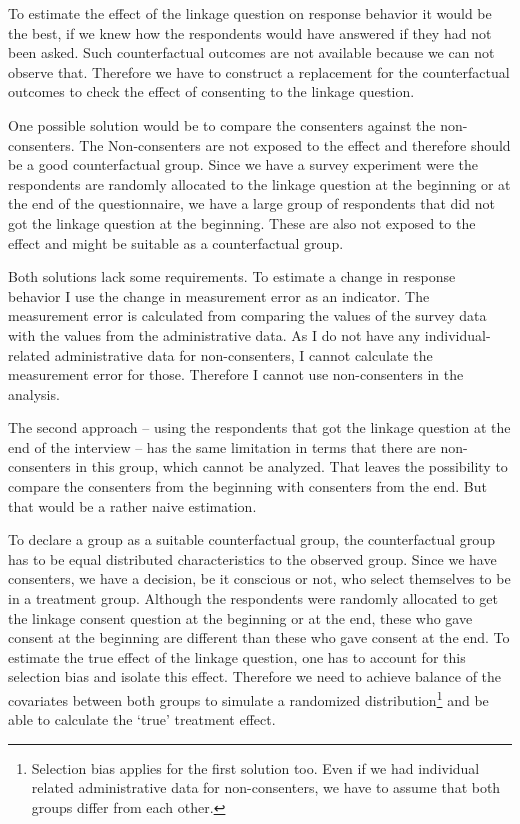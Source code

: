 To estimate the effect of the linkage question on response behavior it would be the best, if we knew how the respondents would have answered if they had not been asked. Such counterfactual outcomes are not available because we can not observe that. Therefore we have to construct a replacement for the counterfactual outcomes to check the effect of consenting to the linkage question. 

One possible solution would be to compare the consenters against the non-consenters. The Non-consenters are not exposed to the effect and therefore should be a good counterfactual group. Since we have a survey experiment were the respondents are randomly allocated to the linkage question at the beginning or at the end of the questionnaire, we have a large group of respondents that did not got the linkage question at the beginning. These are also not exposed to the effect and might be suitable as a counterfactual group. 

Both solutions lack some requirements. To estimate a change in response behavior I use the change in measurement error as an indicator. The measurement error is calculated from comparing the values of the survey data with the values from the administrative data. As I do not have any individual-related administrative data for non-consenters, I cannot calculate the measurement error for those. Therefore I cannot use non-consenters in the analysis. 

The second approach -- using the respondents that got the linkage question at the end of the interview -- has the same limitation in terms that there are non-consenters in this group, which cannot be analyzed. That leaves the possibility to compare the consenters from the beginning with consenters from the end. But that would be a rather naive estimation. 

To declare a group as a suitable counterfactual group, the counterfactual group has to be equal distributed characteristics to the observed group. Since we have consenters, we have a decision, be it conscious or not, who select themselves to be in a treatment group. Although the respondents were randomly allocated to get the linkage consent question at the beginning or at the end, these who gave consent at the beginning are different than these who gave consent at the end. To estimate the true effect of the linkage question, one has to account for this selection bias and isolate this effect. Therefore we need to achieve balance of the covariates between both groups to simulate a randomized distribution\footnote{Selection bias applies for the first solution too. Even if we had individual related administrative data for non-consenters, we have to assume that both groups differ from each other.} and be able to calculate the `true' treatment effect.

